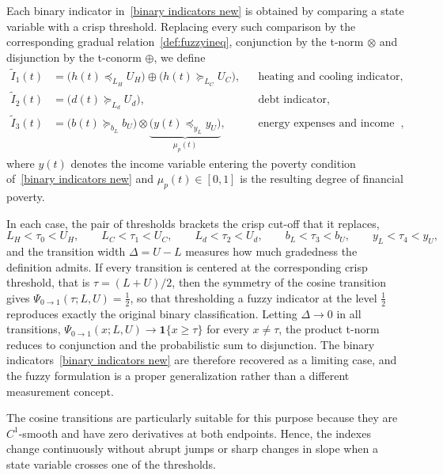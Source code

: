 \documentclass[11pt,a4paper]{article}
\begin{document}
Each binary indicator in~\eqref{binary indicators new} is obtained by comparing a state variable with a crisp threshold. Replacing every such comparison by the corresponding gradual relation~\eqref{def:fuzzyineq}, conjunction by the t-norm $\otimes$ and disjunction by the t-conorm $\oplus$, we define
\begin{align}
\widetilde{I}_1(t)
&=
\bigl(h(t)\preceq_{L_H} U_H\bigr)
\oplus
\bigl(h(t)\succeq_{L_C} U_C\bigr),
&& \text{heating and cooling indicator},
\label{eq:index-heating-cooling}
\\[0.5em]
\widetilde{I}_2(t)
&=
\bigl(d(t)\succeq_{L_d} U_d\bigr),
&& \text{debt indicator},
\label{eq:index-debt}
\\[0.5em]
\widetilde{I}_3(t)
&=
\bigl(b(t)\succeq_{b_L} b_U\bigr)
\otimes
\underbrace{\bigl(y(t)\preceq_{y_L} y_U\bigr)}_{\mu_p(t)},
&& \text{energy expenses and income indicator},
\label{eq:index-expenses-income}
\end{align}
where \(y(t)\) denotes the income variable entering the poverty condition of~\eqref{binary indicators new} and \(\mu_p(t)\in[0,1]\) is the resulting degree of financial poverty.

In each case, the pair of thresholds brackets the crisp cut-off that it replaces,
\[
L_H<\tau_0<U_H,\qquad
L_C<\tau_1<U_C,\qquad
L_d<\tau_2<U_d,\qquad
b_L<\tau_3<b_U,\qquad
y_L<\tau_4<y_U,
\]
and the transition width \(\Delta=U-L\) measures how much gradedness the definition admits. If every transition is centered at the corresponding crisp threshold, that is \(\tau=(L+U)/2\), then the symmetry of the cosine transition gives \(\Psi_{0\to1}(\tau;L,U)=\tfrac12\), so that thresholding a fuzzy indicator at the level \(\tfrac12\) reproduces exactly the original binary classification. Letting \(\Delta\to0\) in all transitions, \(\Psi_{0\to1}(x;L,U)\to\mathbf{1}\{x\ge\tau\}\) for every \(x\neq\tau\), the product t-norm reduces to conjunction and the probabilistic sum to disjunction. The binary indicators~\eqref{binary indicators new} are therefore recovered as a limiting case, and the fuzzy formulation is a proper generalization rather than a different measurement concept.

The cosine transitions are particularly suitable for this purpose because they are \(C^1\)-smooth and have zero derivatives at both endpoints. Hence, the indexes change continuously without abrupt jumps or sharp changes in slope when a state variable crosses one of the thresholds.
\end{document}
